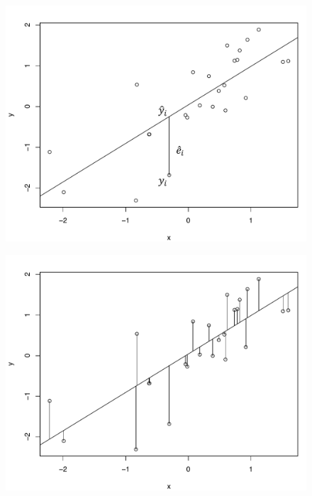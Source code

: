 \documentclass[10pt]{beamer}
\begin{document}
\begin{frame}
\begin{figure}
\includegraphics[scale=0.5]{figure/scatter3_2.pdf}
\end{figure}
\end{frame}

\begin{frame}
\begin{figure}
\includegraphics[scale=0.5]{figure/scatter4_2.pdf}
\end{figure}
\end{frame}
\end{document}
